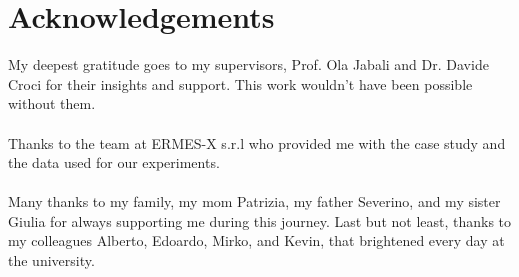 \documentclass[11pt,a4paper,twocolumn]{article}
\begin{document}
\section{Acknowledgements}
My deepest gratitude goes to my supervisors, Prof. Ola Jabali and Dr. Davide Croci for their insights and support.
This work wouldn't have been possible without them.\\
\\
Thanks to the team at ERMES-X s.r.l who provided me with the case study and the data used for our experiments.\\
\\
Many thanks to my family, my mom Patrizia, my father Severino, and my sister Giulia for always supporting me during this journey.
Last but not least, thanks to my colleagues Alberto, Edoardo, Mirko, and Kevin, that brightened every day at the university.

\end{document}

